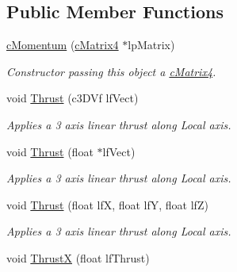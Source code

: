 \subsection*{Public Member Functions}
\begin{DoxyCompactItemize}
\item 
\hypertarget{classc_momentum_a816c2fe90c305565b30f890a24b034ff}{
\hyperlink{classc_momentum_a816c2fe90c305565b30f890a24b034ff}{cMomentum} (\hyperlink{classc_matrix4}{cMatrix4} $\ast$lpMatrix)}
\label{classc_momentum_a816c2fe90c305565b30f890a24b034ff}

\begin{DoxyCompactList}\small\item\em Constructor passing this object a \hyperlink{classc_matrix4}{cMatrix4}. \end{DoxyCompactList}\item 
\hypertarget{classc_momentum_a0f391a6818c89956551fd600005f7a4b}{
void \hyperlink{classc_momentum_a0f391a6818c89956551fd600005f7a4b}{Thrust} (c3DVf lfVect)}
\label{classc_momentum_a0f391a6818c89956551fd600005f7a4b}

\begin{DoxyCompactList}\small\item\em Applies a 3 axis linear thrust along Local axis. \end{DoxyCompactList}\item 
\hypertarget{classc_momentum_ad6ecb8025208e677cfee31abe2368525}{
void \hyperlink{classc_momentum_ad6ecb8025208e677cfee31abe2368525}{Thrust} (float $\ast$lfVect)}
\label{classc_momentum_ad6ecb8025208e677cfee31abe2368525}

\begin{DoxyCompactList}\small\item\em Applies a 3 axis linear thrust along Local axis. \end{DoxyCompactList}\item 
\hypertarget{classc_momentum_a6a1a61d96ab7b10bae49b170603aa107}{
void \hyperlink{classc_momentum_a6a1a61d96ab7b10bae49b170603aa107}{Thrust} (float lfX, float lfY, float lfZ)}
\label{classc_momentum_a6a1a61d96ab7b10bae49b170603aa107}

\begin{DoxyCompactList}\small\item\em Applies a 3 axis linear thrust along Local axis. \end{DoxyCompactList}\item 
\hypertarget{classc_momentum_a4c8e14d57f23820fd66f4f90b0b0cf0c}{
void \hyperlink{classc_momentum_a4c8e14d57f23820fd66f4f90b0b0cf0c}{ThrustX} (float lfThrust)}
\label{classc_momentum_a4c8e14d57f23820fd66f4f90b0b0cf0c}


\end{DoxyCompactItemize}
